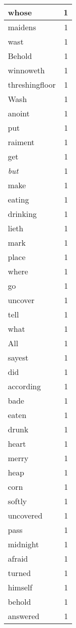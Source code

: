 \begin{center}
\begin{longtable}{l|r}
whose & 1 \\ \hline
maidens & 1 \\ \hline
wast & 1 \\ \hline
Behold & 1 \\ \hline
winnoweth & 1 \\ \hline
threshingfloor & 1 \\ \hline
Wash & 1 \\ \hline
anoint & 1 \\ \hline
put & 1 \\ \hline
raiment & 1 \\ \hline
get & 1 \\ \hline
\emph{but} & 1 \\ \hline
make & 1 \\ \hline
eating & 1 \\ \hline
drinking & 1 \\ \hline
lieth & 1 \\ \hline
mark & 1 \\ \hline
place & 1 \\ \hline
where & 1 \\ \hline
go & 1 \\ \hline
uncover & 1 \\ \hline
tell & 1 \\ \hline
what & 1 \\ \hline
All & 1 \\ \hline
sayest & 1 \\ \hline
did & 1 \\ \hline
according & 1 \\ \hline
bade & 1 \\ \hline
eaten & 1 \\ \hline
drunk & 1 \\ \hline
heart & 1 \\ \hline
merry & 1 \\ \hline
heap & 1 \\ \hline
corn & 1 \\ \hline
softly & 1 \\ \hline
uncovered & 1 \\ \hline
pass & 1 \\ \hline
midnight & 1 \\ \hline
afraid & 1 \\ \hline
turned & 1 \\ \hline
himself & 1 \\ \hline
behold & 1 \\ \hline
answered & 1 \\ \hline

\end{longtable}
\end{center}
